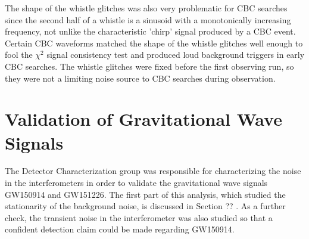 The shape of the whistle 
glitches was also very problematic for CBC searches since the second half of a 
whistle is a sinusoid with a monotonically increasing frequency, not unlike the 
characteristic 'chirp' signal produced by a CBC event. Certain CBC waveforms 
matched the shape of the whistle glitches well enough to fool the $\chi^2$ signal 
consistency test and produced loud background triggers in early CBC searches. 
The whistle glitches 
were fixed before the first observing run, so they were not a limiting noise source 
to CBC searches during observation.

%
%
%
%
%
%
%
%
%
%

\section{Validation of Gravitational Wave Signals}\label{sec:GW150914-validation}

The Detector Characterization group was responsible for characterizing the 
noise in the interferometers in order to validate the gravitational 
wave signals GW150914 and GW151226. The first part of this analysis, which studied the 
stationarity of the background noise, is discussed in Section ?? . As a further 
check, the transient noise in the interferometer was also studied so that a 
confident detection claim could be made regarding GW150914. 

